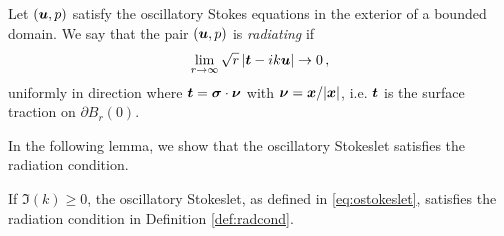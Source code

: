 \begin{definition} \label{def:radcond}
Let $({\boldsymbol u},p)$ satisfy the oscillatory Stokes equations in
the exterior of a bounded domain. We say that
the pair $({\boldsymbol u},p)$ is {\em radiating} if
\begin{equation}
\lim_{r\to \infty} \sqrt{r} \left| {\boldsymbol t} - i k {\boldsymbol u} \right| \to 0 \, ,
\label{eq:radcond}
\end{equation}
uniformly in direction where ${\boldsymbol t} = {\boldsymbol \sigma} \cdot {\boldsymbol \nu}$
with ${\boldsymbol \nu} = {\boldsymbol x}/|{\boldsymbol x}|$, i.e. ${\boldsymbol t}$ is the surface
traction on $\partial B_r(0)$.     
\end{definition}

In the following lemma, we show that the oscillatory
Stokeslet satisfies the radiation condition. 
\begin{lemma}
  {\color{red}If $\Im (k) \geq 0$, the} oscillatory Stokeslet,
  as defined in \eqref{eq:ostokeslet}, satisfies the radiation
  condition in
  Definition \ref{def:radcond}.
\end{lemma}
